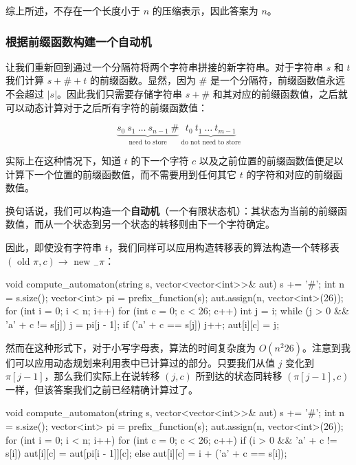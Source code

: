 综上所述，不存在一个长度小于 $n$ 的压缩表示，因此答案为 $n$。

\subsubsection{根据前缀函数构建一个自动机}

让我们重新回到通过一个分隔符将两个字符串拼接的新字符串。对于字符串 $s$ 和 $t$ 我们计算 $s + \# + t$ 的前缀函数。显然，因为 $\#$ 是一个分隔符，前缀函数值永远不会超过 $|s|$。因此我们只需要存储字符串 $s + \#$ 和其对应的前缀函数值，之后就可以动态计算对于之后所有字符的前缀函数值：

$$
\underbrace{s_0 ~ s_1 ~ \dots ~ s_{n-1} ~ \#}_{\text{need to store}} ~ \underbrace{t_0 ~ t_1 ~ \dots ~ t_{m-1}}_{\text{do not need to store}}
$$

实际上在这种情况下，知道 $t$ 的下一个字符 $c$ 以及之前位置的前缀函数值便足以计算下一个位置的前缀函数值，而不需要用到任何其它 $t$ 的字符和对应的前缀函数值。

换句话说，我们可以构造一个\textbf{自动机}（一个有限状态机）：其状态为当前的前缀函数值，而从一个状态到另一个状态的转移则由下一个字符确定。

因此，即使没有字符串 $t$，我们同样可以应用构造转移表的算法构造一个转移表 $( \text { old } \pi , c ) \rightarrow \text { new } _ { - } \pi$：

\begin{cppcode}
void compute_automaton(string s, vector<vector<int>>& aut) {
  s += '#';
  int n = s.size();
  vector<int> pi = prefix_function(s);
  aut.assign(n, vector<int>(26));
  for (int i = 0; i < n; i++) {
    for (int c = 0; c < 26; c++) {
      int j = i;
      while (j > 0 && 'a' + c != s[j]) j = pi[j - 1];
      if ('a' + c == s[j]) j++;
      aut[i][c] = j;
    }
  }
}
\end{cppcode}

然而在这种形式下，对于小写字母表，算法的时间复杂度为 $O(n^2 26)$。注意到我们可以应用动态规划来利用表中已计算过的部分。只要我们从值 $j$ 变化到 $\pi[j - 1]$，那么我们实际上在说转移 $(j, c)$ 所到达的状态同转移 $(\pi[j - 1], c)$ 一样，但该答案我们之前已经精确计算过了。

\begin{cppcode}
void compute_automaton(string s, vector<vector<int>>& aut) {
  s += '#';
  int n = s.size();
  vector<int> pi = prefix_function(s);
  aut.assign(n, vector<int>(26));
  for (int i = 0; i < n; i++) {
    for (int c = 0; c < 26; c++) {
      if (i > 0 && 'a' + c != s[i])
        aut[i][c] = aut[pi[i - 1]][c];
      else
        aut[i][c] = i + ('a' + c == s[i]);
    }
  }
}
\end{cppcode}


